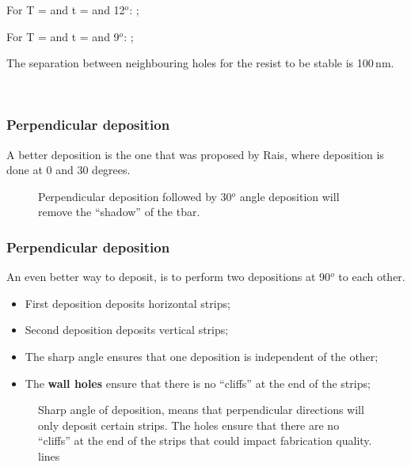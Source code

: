 \begin{framed}\noindent
  For T  =  and  t =  and  12$^o$: \hfill
  ;

  \noindent For T =   and t =  and 9$^o$:
  \hfill {};

  The separation between neighbouring holes for the resist to be stable
  is 100\,nm.



\begin{center}
   \\
\end{center}
\end{framed}

\subsubsection{Perpendicular deposition}
\label{sec:perp-depos}

A  better deposition  is  the  one that  was  proposed  by Rais,  where
deposition is done at 0 and 30 degrees.
\begin{figure}[h]
  \centering {}
  \caption{\small  Perpendicular deposition  followed  by 30$^o$  angle
    deposition     will     remove     the    ``shadow''     of     the
    tbar.\label{fig:0and30}}
\end{figure}

\subsubsection{Perpendicular deposition}
\label{sec:perp-depos-1}

An even better way to deposit,  is to perform two depositions at 90$^o$
to each other.

\begin{itemize}
\item First deposition deposits horizontal strips;
\item Second deposition deposits vertical strips;
\item The sharp angle ensures that one deposition is independent of the
  other;
\item The \textbf{wall holes} ensure that there is no ``cliffs'' at the
  end of the strips;
\end{itemize}

\begin{figure}[h]
  \centering {}
  \caption{\small Sharp  angle of deposition, means  that perpendicular
    directions will only deposit certain  strips. The holes ensure that
    there are no ``cliffs'' at the  end of the strips that could impact
    fabrication quality.  lines\label{fig:perpendicular_deposition}}
\end{figure}

